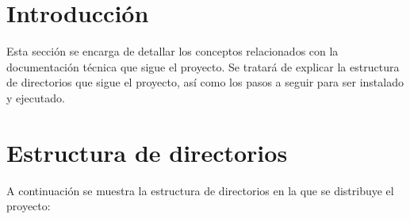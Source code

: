 
\section{Introducción}

Esta sección se encarga de detallar los conceptos relacionados con la documentación técnica que sigue el proyecto. Se tratará de explicar la estructura de directorios que sigue el proyecto, así como los pasos a seguir para ser instalado y ejecutado.

\section{Estructura de directorios}

A continuación se muestra la estructura de directorios en la que se distribuye el proyecto:

